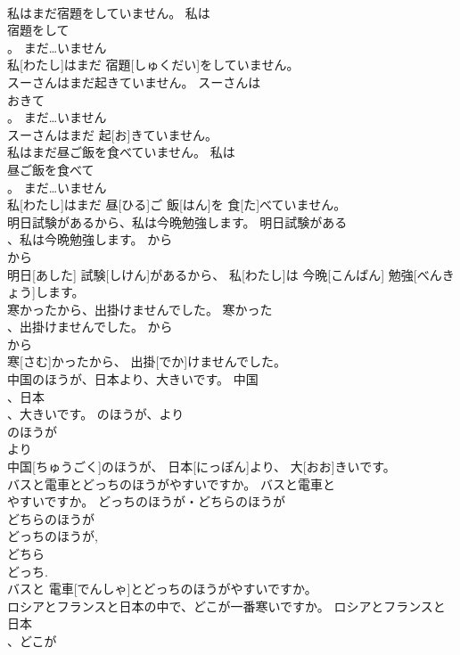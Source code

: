 \documentclass[8pt]{extreport}
\begin{document}
\begin{CJK}{UTF8}{min}
\\	私はまだ宿題をしていません。	私は
\\	宿題をして
\\	。	まだ…いません	
\\	私[わたし]はまだ 宿題[しゅくだい]をしていません。	
\\	スーさんはまだ起きていません。	スーさんは
\\	おきて
\\	。	まだ…いません	
\\	スーさんはまだ 起[お]きていません。	
\\	私はまだ昼ご飯を食べていません。	私は
\\	昼ご飯を食べて
\\	。	まだ…いません	
\\	私[わたし]はまだ 昼[ひる]ご 飯[はん]を 食[た]べていません。	
\\	明日試験があるから、私は今晩勉強します。	明日試験がある
\\	、私は今晩勉強します。	から	
\\	から 
\\	明日[あした] 試験[しけん]があるから、 私[わたし]は 今晩[こんばん] 勉強[べんきょう]します。	
\\	寒かったから、出掛けませんでした。	寒かった
\\	、出掛けませんでした。	から	
\\	から 
\\	寒[さむ]かったから、 出掛[でか]けませんでした。	
\\	中国のほうが、日本より、大きいです。	中国
\\	、日本
\\	、大きいです。	のほうが、より	
\\	のほうが 
\\	より 
\\	中国[ちゅうごく]のほうが、 日本[にっぽん]より、 大[おお]きいです。	
\\	バスと電車とどっちのほうがやすいですか。	バスと電車と
\\	やすいですか。	どっちのほうが・どちらのほうが	
\\	どちらのほうが 
\\	どっちのほうが, 
\\	どちら 
\\	どっち. 
\\	バスと 電車[でんしゃ]とどっちのほうがやすいですか。	
\\	ロシアとフランスと日本の中で、どこが一番寒いですか。	ロシアとフランスと日本
\\	、どこが

\end{CJK}
\end{document}
